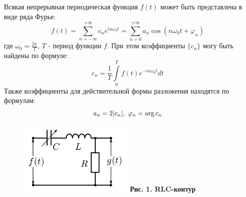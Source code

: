 \documentclass[15pt,a5paper,reqno]{article}
\begin{document}
    Всякая непрерывная периодическая функция $f(t)$ может быть представлена в виде ряда Фурье:
    \begin{equation*}
        f(t) = \sum\limits_{n = -\infty}^{+\infty} c_n e^{i n \omega_0 t} = \sum\limits_{n = 0}^{+\infty} a_n \cos{(n\omega_0 t + \varphi_n)}
    \end{equation*}
    где $\omega_0 = \frac{2\pi}{T}$, $T$ - период функции $f$. При этом коэффициенты $\{c_n\}$ могу быть найдены по формуле:
    \begin{equation*}
        c_n = \frac{1}{T}\int\limits_{0}^{T} f(t)e^{-i n \omega_0 t} dt
    \end{equation*}
    Также коэффициенты для действительной формы разложения находятся по формулам:
    \begin{equation*}
        a_n = 2|c_n|,\\\ \varphi_n = \arg{c_n}
    \end{equation*}
    
    \begin{figure}
        \includegraphics[width=0.5\textwidth]{images/picture_1.png}
        \textbf{Рис. 1. RLC-контур}
    \end{figure}
    
\end{document}
